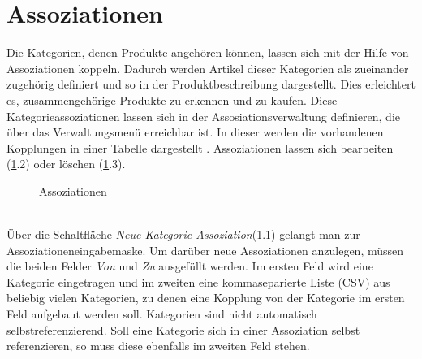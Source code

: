 \section{Assoziationen}
\label{chp:Assoziationen}
Die Kategorien, denen Produkte angehören können, lassen sich mit der Hilfe von Assoziationen koppeln. Dadurch werden Artikel dieser Kategorien als zueinander zu\-ge\-hö\-rig definiert und so in der Produktbeschreibung  dargestellt. Dies erleichtert es, zusammengehörige Produkte zu erkennen und zu kaufen. Diese Kategorieassoziationen lassen sich in der Assosiationsverwaltung definieren, die über das Verwaltungsmenü erreichbar ist. In dieser werden die vorhandenen Kopplungen in einer Tabelle dargestellt . Assoziationen lassen sich bearbeiten (\ref{fig:Assoziationen}.2) oder löschen (\ref{fig:Assoziationen}.3). \\

\begin{figure}[h!]
  \centering
  \caption{Assoziationen}
  \label{fig:Assoziationen}
\end{figure}
\text{}\vspace*{-1em}\\
Über die Schaltfläche \textit{Neue Kategorie-Assoziation}(\ref{fig:Assoziationen}.1) gelangt man zur Asso\-zia\-tionen\-ein\-ga\-be\-mas\-ke. Um darüber neue Assoziationen anzulegen, müssen die beiden Felder \textit{Von} und \textit{Zu} ausgefüllt werden. Im ersten Feld wird eine Kategorie eingetragen und im zweiten eine kommaseparierte Liste (CSV) aus beliebig vielen Kategorien, zu denen eine Kopplung von der Kategorie im ersten Feld aufgebaut werden soll. Kategorien sind nicht automatisch selbstreferenzierend. Soll eine Kategorie sich in einer Assoziation selbst referenzieren, so muss diese ebenfalls im zweiten Feld stehen.


